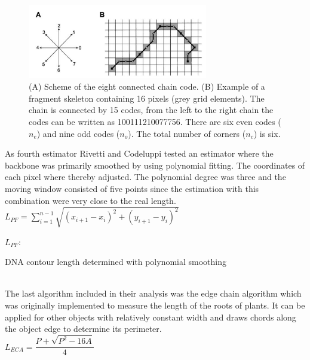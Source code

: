\documentclass{article}
\begin{document}
\begin{figure}[htb]
\begin{center}
\includegraphics[width = 0.7\textwidth]{freeman}
\end{center}
\caption{(A) Scheme of the eight connected chain code. (B) Example of a fragment skeleton containing 16 pixels (grey grid elements). The chain is connected by 15 codes, from the left to the right chain the codes can be written as 100111210077756. There are six even codes ($ n_{e} $) and nine odd codes ($ n_{o} $). The total number of corners ($ n_{c}$) is six.}
\label{fig: freeman} %
\end{figure}

As fourth estimator Rivetti and Codeluppi tested an estimator where the backbone was primarily smoothed by using polynomial fitting. The coordinates of each pixel where thereby adjusted. The polynomial degree was three and the moving window consisted of five points since the estimation with this combination were very close to the real length. \\ 

$ L_{PF} = \sum_{i=1}^{n-1} \sqrt{(x_{i+1}-x_{i})^{2} + (y_{i+1}-y_{i})^{2}} $

\hspace{0,2cm}

$ L_{PF} $: \begin{footnotesize}
DNA contour length determined with polynomial smoothing
\end{footnotesize} \\



The last algorithm included in their analysis was the edge chain algorithm which was originally implemented to measure the length of the roots of plants. It can be applied for other objects with relatively constant width and draws chords along the object edge to determine its perimeter. \\

$ L_{ECA}=\dfrac{P+\sqrt{P^{2}-16A}}{4} $

\hspace{0,2cm}
\end{document}
